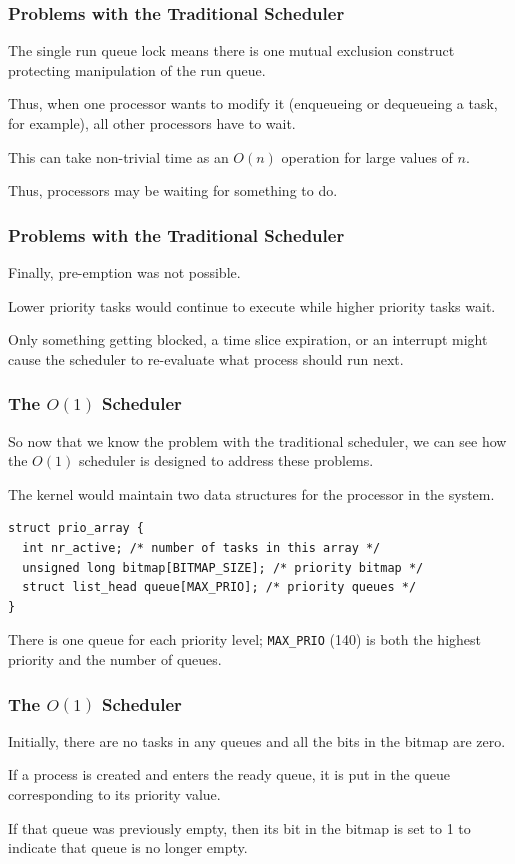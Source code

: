 \begin{frame}
\frametitle{Problems with the Traditional Scheduler}

The single run queue lock means there is one mutual exclusion construct protecting manipulation of the run queue. 

Thus, when one processor wants to modify it (enqueueing or dequeueing a task, for example), all other processors have to wait.

This can take non-trivial time as an $O(n)$ operation for large values of $n$.


Thus, processors may be waiting for something to do.

\end{frame}

\begin{frame}
\frametitle{Problems with the Traditional Scheduler}

Finally, pre-emption was not possible. 

Lower priority tasks would continue to execute while higher priority tasks wait. 

Only something getting blocked, a time slice expiration, or an interrupt might cause the scheduler to re-evaluate what process should run next.


\end{frame}

\begin{frame}[fragile]
\frametitle{The $O(1)$ Scheduler}

So now that we know the problem with the traditional scheduler, we can see how the $O(1)$ scheduler is designed to address these problems. 

The kernel would maintain two data structures for the processor in the system.

\begin{verbatim}
struct prio_array {
  int nr_active; /* number of tasks in this array */
  unsigned long bitmap[BITMAP_SIZE]; /* priority bitmap */
  struct list_head queue[MAX_PRIO]; /* priority queues */
}
\end{verbatim}

There is one queue for each priority level; \texttt{MAX\_PRIO} (140) is both the highest priority and the number of queues. 

\end{frame}

\begin{frame}
\frametitle{The $O(1)$ Scheduler}

Initially, there are no tasks in any queues and all the bits in the bitmap are zero. 

If a process is created and enters the ready queue, it is put in the queue corresponding to its priority value. 

If that queue was previously empty, then its bit in the bitmap is set to 1 to indicate that queue is no longer empty.


\end{frame}

